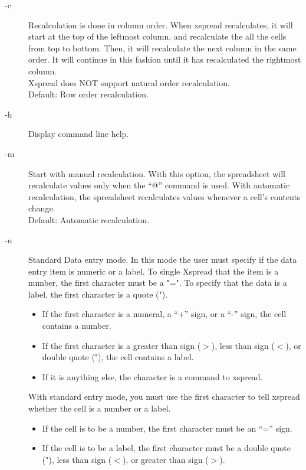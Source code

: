 \begin{description}
\item[-c]{ Recalculation is done in column order.  When xspread recalculates, it will
start at the top of the leftmost column, and recalculate the all the cells 
from top to bottom.  Then, it will recalculate the next column in the same 
order.  It will continue in this fashion until it has recalculated the 
rightmost column.\\
Xspread does NOT support natural order recalculation.\\
Default:  Row order recalculation.}

\item[-h]{  Display command line help.}

\item[-m]{  Start with manual recalculation.  With this option, the spreadsheet will
recalculate values only when the ``@'' command is used.  With automatic
recalculation, the spreadsheet recalculates values whenever a cell's 
contents change.\\
Default:  Automatic recalculation.}

\item[-n]{  Standard Data entry mode.  In this mode the user must specify if
     the data entry item is numeric or a label.  To single Xspread that the
     item is a number, the first character must be a "=".  To specify that 
     the data is a label, the first character is a quote (").}

  \begin{itemize}
  \item{If the first character is a numeral, a ``+'' sign, or a ``-'' sign,
	the cell contains a number.}
  \item{If the first character is a greater than sign ($>$), less than 
     sign ($<$), or double quote ("), the cell contains a label.}
  \item{If it is anything else, the character is a command to xspread.}
  \end{itemize}

With standard entry mode, you must use the first character to tell xspread
whether the cell is a number or a label.

  \begin{itemize}
  \item{If the cell is to be a number, the first character must be an ``=''
        sign.}
  \item{If the cell is to be a label, the first character must be a double
        quote ("), less than sign ($<$), or greater than sign ($>$).}
  \end{itemize}


\end{description}
